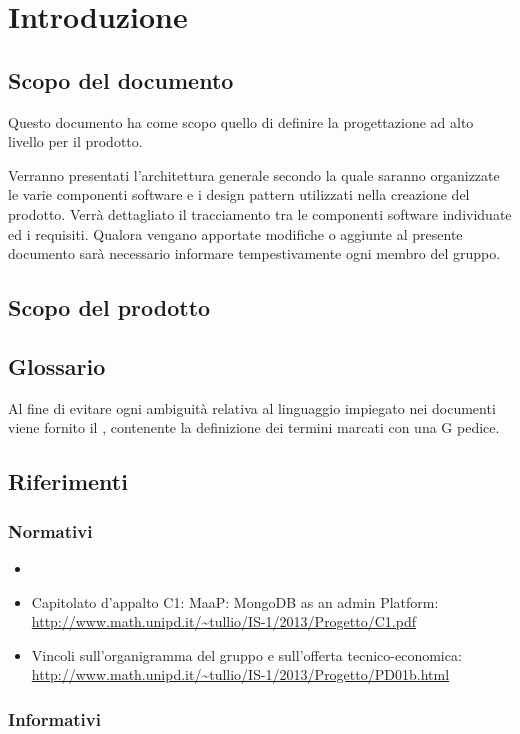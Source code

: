 \section{Introduzione}

\subsection{Scopo del documento}

Questo documento ha come scopo quello di definire la progettazione ad alto livello per il prodotto.

Verranno presentati l'architettura generale secondo la quale saranno organizzate le varie componenti software e i design pattern utilizzati nella creazione del prodotto.
Verrà dettagliato il tracciamento tra le componenti software individuate ed i requisiti.
Qualora vengano apportate modifiche o aggiunte al presente documento sarà necessario informare tempestivamente ogni membro del gruppo.

\subsection{Scopo del prodotto}

\ScopoDelProdotto

\subsection{Glossario}

Al fine di evitare ogni ambiguità relativa al linguaggio impiegato nei documenti viene fornito il \Glossario{}, contenente la definizione dei termini marcati con una G pedice.

\subsection{Riferimenti}
	\label{Riferimenti}
	
		\subsubsection{Normativi}
		
		\begin{itemize}
		\item \NormeDiProgetto
		\item Capitolato d'appalto C1: MaaP: MongoDB as an admin Platform:\\
			\url{http://www.math.unipd.it/~tullio/IS-1/2013/Progetto/C1.pdf}
		\item Vincoli sull'organigramma del gruppo e sull'offerta tecnico-economica:\\
			\url{http://www.math.unipd.it/~tullio/IS-1/2013/Progetto/PD01b.html}
        \end{itemize}
        
		\subsubsection{Informativi}
		
		
	\pagebreak